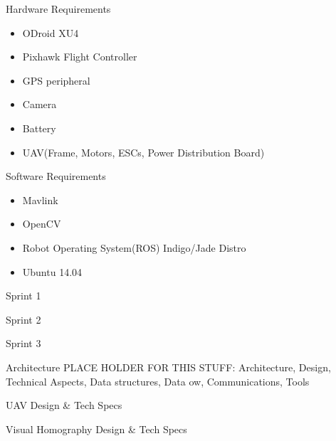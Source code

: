 \documentclass[11pt]{beamer}
\begin{document}
\begin{frame}{Hardware Requirements}
\begin{itemize}
\item ODroid XU4
\item Pixhawk Flight Controller
\item GPS peripheral
\item Camera
\item Battery
\item UAV(Frame, Motors, ESCs, Power Distribution Board)
\end{itemize}

\end{frame}

\begin{frame}{Software Requirements}
\begin{itemize}
\item Mavlink
\item OpenCV
\item Robot Operating System(ROS) Indigo/Jade Distro
\item Ubuntu 14.04
\end{itemize}

\end{frame}


\begin{frame}{Sprint 1}
\end{frame}


\begin{frame}{Sprint 2}
\end{frame}


\begin{frame}{Sprint 3}
\end{frame}


\begin{frame}{Architecture}
PLACE HOLDER FOR THIS STUFF:
Architecture, Design, Technical Aspects, Data structures, Data ow, Communications, Tools
\end{frame}

\begin{frame}{UAV Design \& Tech Specs}

\end{frame}

\begin{frame}{Visual Homography Design \& Tech Specs}

\end{frame}
\end{document}
